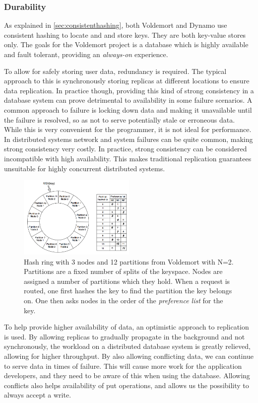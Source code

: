 \subsubsection{Durability}
As explained in \ref{sec:consistenthashing}, both Voldemort and Dynamo use consistent hashing to locate and and store keys.
They are both key-value stores only.
The goals for the Voldemort project is a database which is highly available and fault tolerant, providing an \emph{always-on} experience.

To allow for safely storing user data, redundancy is required. 
The typical approach to this is synchronously storing replicas at different locations to ensure data replication. 
In practice though, providing this kind of strong consistency in a database system can prove detrimental to availability in some failure scenarios.
A common approach to failure is locking down data and making it unavailable until the failure is resolved, so as not to serve potentially stale or erroneous data.
While this is very convenient for the programmer, it is not ideal for performance.
In distributed systems network and system failures can be quite common, making strong consistency very costly. In practice, strong consistency can be considered incompatible with high availability.
This makes traditional replication guarantees unsuitable for highly concurrent distributed systems.

\begin{figure}
    \includegraphics[width=0.5\textwidth]{introduction/hashring_voldemort}
    \caption{Hash ring with 3 nodes and 12 partitions from Voldemort\cite{dynamo} with N=2. Partitions are a fixed number of splits of the keyspace. Nodes are assigned a number of partitions which they hold. When a request is routed, one first hashes the key to find the partition the key belongs on. One then asks nodes in the order of the \emph{preference list} for the key.}
    \label{fig:voldemort_hashring}
\end{figure}

To help provide higher availability of data, an optimistic approach to replication is used.
By allowing replicas to gradually propagate in the background and not synchronously, the workload on a distributed database system is greatly relieved, allowing for higher throughput. By also allowing conflicting data, we can continue to serve data in times of failure. This will cause more work for the application developers, and they need to be aware of this when using the database. Allowing conflicts also helps availability of put operations, and allows us the possibility to always accept a write.

